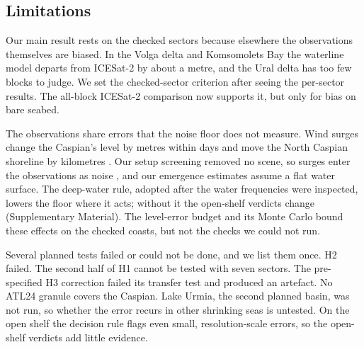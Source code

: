 \subsection{Limitations}
\label{sec:dis_limits}
Our main result rests on the checked sectors because elsewhere the observations themselves are biased. In the Volga delta and Komsomolets Bay the waterline model departs from ICESat-2 by about a metre, and the Ural delta has too few blocks to judge. We set the checked-sector criterion after seeing the per-sector results. The all-block ICESat-2 comparison now supports it, but only for bias on bare seabed. 

The observations share errors that the noise floor does not measure. Wind surges change the Caspian's level by metres within days \citep{lahijani2023} and move the North Caspian shoreline by kilometres \citep{pavlova2020,yeltay2026}. Our setup screening removed no scene,  so surges enter the observations as noise , and our emergence estimates assume a flat water surface. The deep-water rule, adopted after the water frequencies were inspected, lowers the floor where it acts; without it the open-shelf verdicts change (Supplementary Material). The level-error budget and its Monte Carlo bound these effects on the checked coasts, but not the  checks we could not run.

Several planned tests failed or could not be done, and we list them once. H2 failed. The second half of H1 cannot be tested with seven sectors. The pre-specified H3 correction failed its transfer test and produced an artefact. No ATL24 granule covers the Caspian. Lake Urmia, the second planned basin, was not run, so whether the error recurs in other shrinking seas is untested. On the open shelf the decision rule flags even small, resolution-scale errors, so the open-shelf verdicts add little evidence.

